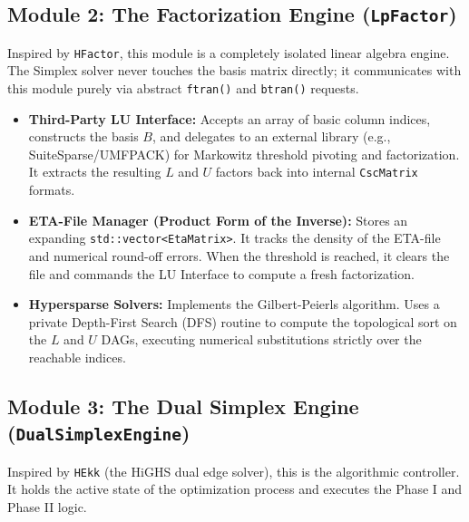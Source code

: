 \documentclass[11pt, a4paper]{article}
\begin{document}
\subsection{Module 2: The Factorization Engine (\texttt{LpFactor})}

Inspired by \texttt{HFactor}, this module is a completely isolated linear algebra engine. The Simplex solver never touches the basis matrix directly; it communicates with this module purely via abstract \texttt{ftran()} and \texttt{btran()} requests.

\begin{itemize}[itemsep=4pt, leftmargin=*]
    \item \textbf{Third-Party LU Interface:} Accepts an array of basic column indices, constructs the basis $B$, and delegates to an external library (e.g., SuiteSparse/UMFPACK) for Markowitz threshold pivoting and factorization. It extracts the resulting $L$ and $U$ factors back into internal \texttt{CscMatrix} formats.
    \item \textbf{ETA-File Manager (Product Form of the Inverse):} Stores an expanding \texttt{std::vector<EtaMatrix>}. It tracks the density of the ETA-file and numerical round-off errors. When the threshold is reached, it clears the file and commands the LU Interface to compute a fresh factorization.
    \item \textbf{Hypersparse Solvers:} Implements the Gilbert-Peierls algorithm. Uses a private Depth-First Search (DFS) routine to compute the topological sort on the $L$ and $U$ DAGs, executing numerical substitutions strictly over the reachable indices.
\end{itemize}

\subsection{Module 3: The Dual Simplex Engine (\texttt{DualSimplexEngine})}

Inspired by \texttt{HEkk} (the HiGHS dual edge solver), this is the algorithmic controller. It holds the active state of the optimization process and executes the Phase I and Phase II logic.
\end{document}

